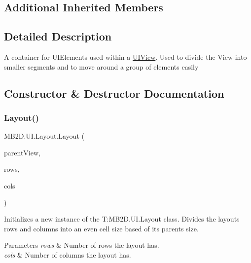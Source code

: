 \subsection*{Additional Inherited Members}


\subsection{Detailed Description}
A container for U\+I\+Elements used within a \hyperlink{class_m_b2_d_1_1_u_i_1_1_u_i_view}{U\+I\+View}. Used to divide the View into smaller segments and to move around a group of elements easily 



\subsection{Constructor \& Destructor Documentation}
\hypertarget{class_m_b2_d_1_1_u_i_1_1_layout_a86bd9b8fde99644021327ce66b71d0b5}{}\label{class_m_b2_d_1_1_u_i_1_1_layout_a86bd9b8fde99644021327ce66b71d0b5} 
\subsubsection{\texorpdfstring{Layout()}{Layout()}}
{\footnotesize\ttfamily M\+B2\+D.\+U\+I.\+Layout.\+Layout (\begin{DoxyParamCaption}\item[{\hyperlink{class_m_b2_d_1_1_u_i_1_1_u_i_view}{U\+I\+View}}]{parent\+View,  }\item[{int}]{rows,  }\item[{int}]{cols }\end{DoxyParamCaption})\hspace{0.3cm}{\ttfamily [inline]}}



Initializes a new instance of the T\+:\+M\+B2\+D.\+U\+I.\+Layout class. Divides the layouts rows and columns into an even cell size based of its parents size. 


\begin{DoxyParams}{Parameters}
{\em rows} & Number of rows the layout has.\\
\hline
{\em cols} & Number of columns the layout has.\\
\hline
\end{DoxyParams}


